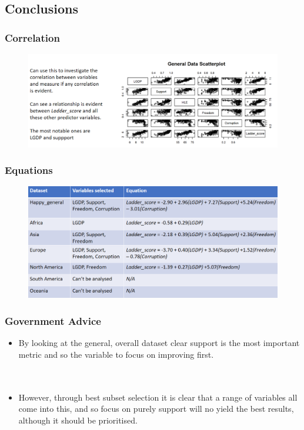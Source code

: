 \documentclass{beamer}
\begin{document}
\subsection{Conclusions}
% 
% 
% 
% 
\begin{frame}
  \frametitle{Correlation}
  \begin{figure}
    \includegraphics[width=\textwidth]{img/Scatter plot.png}
  \end{figure}
\end{frame}
% 
% 
% 
% 
% 
% 
\begin{frame}
  \frametitle{Equations}
  \begin{figure}
    \includegraphics[width=\textwidth]{img/Equations.png}
  \end{figure}
\end{frame}
% 
% 
% 
% 
% 
% 
% 
\begin{frame}
  \frametitle{Government Advice}
  \begin{itemize}
    \item By looking at the general, overall dataset clear support is the most important metric and so the variable to focus on improving first. \\ \ \\ \ \\
    \item However, through best subset selection it is clear that a range of variables all come into this, and so focus on purely support will no yield the best results, although it should be prioritised.
  \end{itemize}
\end{frame}
\end{document}
